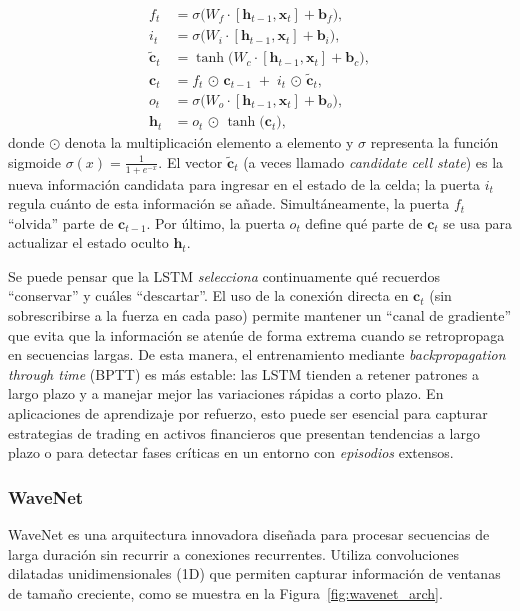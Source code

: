 \documentclass[11pt,a4paper,spanish]{article}
\numberwithin{equation}{section} %
\begin{document}
\begin{align}
    f_t &= \sigma\!\bigl(W_f \cdot [\mathbf{h}_{t-1}, \mathbf{x}_t] + \mathbf{b}_f\bigr), \\
    i_t &= \sigma\!\bigl(W_i \cdot [\mathbf{h}_{t-1}, \mathbf{x}_t] + \mathbf{b}_i\bigr), \\
    \tilde{\mathbf{c}}_t &= \tanh\!\bigl(W_c \cdot [\mathbf{h}_{t-1}, \mathbf{x}_t] + \mathbf{b}_c\bigr), \\
    \mathbf{c}_t &= f_t \,\odot\, \mathbf{c}_{t-1} \;+\; i_t \,\odot\, \tilde{\mathbf{c}}_t, \\
    o_t &= \sigma\!\bigl(W_o \cdot [\mathbf{h}_{t-1}, \mathbf{x}_t] + \mathbf{b}_o\bigr), \\
    \mathbf{h}_t &= o_t \,\odot\, \tanh\!\bigl(\mathbf{c}_t\bigr),
\end{align}
donde \(\odot\) denota la multiplicación elemento a elemento y \(\sigma\) representa la función sigmoide \(\sigma(x) = \tfrac{1}{1 + e^{-x}}\). El vector \(\tilde{\mathbf{c}}_t\) (a veces llamado \emph{candidate cell state}) es la nueva información candidata para ingresar en el estado de la celda; la puerta \(i_t\) regula cuánto de esta información se añade. Simultáneamente, la puerta \(f_t\) “olvida” parte de \(\mathbf{c}_{t-1}\). Por último, la puerta \(o_t\) define qué parte de \(\mathbf{c}_t\) se usa para actualizar el estado oculto \(\mathbf{h}_t\).

Se puede pensar que la LSTM \emph{selecciona} continuamente qué recuerdos “conservar” y cuáles “descartar”. El uso de la conexión directa en \(\mathbf{c}_t\) (sin sobrescribirse a la fuerza en cada paso) permite mantener un “canal de gradiente” que evita que la información se atenúe de forma extrema cuando se retropropaga en secuencias largas. De esta manera, el entrenamiento mediante \emph{backpropagation through time} (BPTT) es más estable: las LSTM tienden a retener patrones a largo plazo y a manejar mejor las variaciones rápidas a corto plazo. En aplicaciones de aprendizaje por refuerzo, esto puede ser esencial para capturar estrategias de trading en activos financieros que presentan tendencias a largo plazo o para detectar fases críticas en un entorno con \emph{episodios} extensos.



\subsubsection{WaveNet}
\label{subsubsec:wavenet}

WaveNet es una arquitectura innovadora diseñada para procesar secuencias de larga duración sin recurrir a conexiones recurrentes. Utiliza convoluciones dilatadas unidimensionales (1D) que permiten capturar información de ventanas de tamaño creciente, como se muestra en la Figura~\ref{fig:wavenet_arch}.
\end{document}
